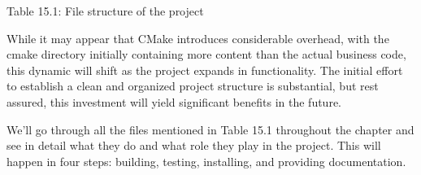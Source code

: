 \begin{center}
Table 15.1: File structure of the project
\end{center}

While it may appear that CMake introduces considerable overhead, with the cmake directory initially containing more content than the actual business code, this dynamic will shift as the project expands in functionality. The initial effort to establish a clean and organized project structure is substantial, but rest assured, this investment will yield significant benefits in the future.

We’ll go through all the files mentioned in Table 15.1 throughout the chapter and see in detail what they do and what role they play in the project. This will happen in four steps: building, testing, installing, and providing documentation.















































